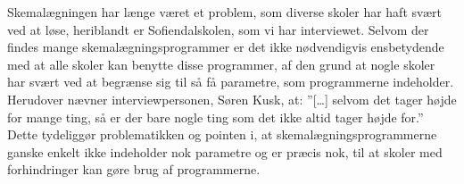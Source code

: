 Skemalægningen har længe været et problem, som diverse skoler har haft svært ved at løse, heriblandt er Sofiendalskolen, som vi har interviewet.
Selvom der findes mange skemalægningsprogrammer er det ikke nødvendigvis ensbetydende med at alle skoler kan benytte disse programmer, af den grund at nogle skoler har svært ved at begrænse sig til så få parametre, som programmerne indeholder. Herudover nævner interviewpersonen, Søren Kusk, at: ”[…] selvom det tager højde for mange ting, så er der bare nogle ting som det ikke altid tager højde for.” Dette tydeliggør problematikken og pointen i, at skemalægningsprogrammerne ganske enkelt ikke indeholder nok parametre og er præcis nok, til at skoler med forhindringer kan gøre brug af programmerne\cite{interview}. 